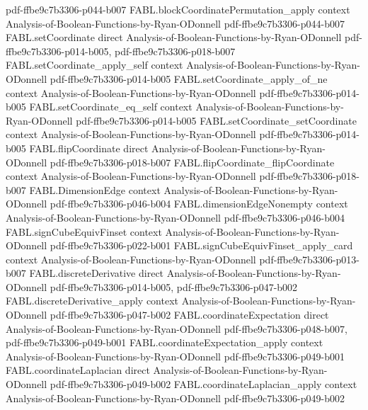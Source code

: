\begin{theorem}
  {pdf-ffbe9c7b3306-p044-b007}
\proofstep
  {FABL.blockCoordinatePermutation_apply}
  {context}
  {Analysis-of-Boolean-Functions-by-Ryan-ODonnell}
  {pdf-ffbe9c7b3306-p044-b007}
\proofstep
  {FABL.setCoordinate}
  {direct}
  {Analysis-of-Boolean-Functions-by-Ryan-ODonnell}
  {pdf-ffbe9c7b3306-p014-b005,
    pdf-ffbe9c7b3306-p018-b007}
\proofstep
  {FABL.setCoordinate_apply_self}
  {context}
  {Analysis-of-Boolean-Functions-by-Ryan-ODonnell}
  {pdf-ffbe9c7b3306-p014-b005}
\proofstep
  {FABL.setCoordinate_apply_of_ne}
  {context}
  {Analysis-of-Boolean-Functions-by-Ryan-ODonnell}
  {pdf-ffbe9c7b3306-p014-b005}
\proofstep
  {FABL.setCoordinate_eq_self}
  {context}
  {Analysis-of-Boolean-Functions-by-Ryan-ODonnell}
  {pdf-ffbe9c7b3306-p014-b005}
\proofstep
  {FABL.setCoordinate_setCoordinate}
  {context}
  {Analysis-of-Boolean-Functions-by-Ryan-ODonnell}
  {pdf-ffbe9c7b3306-p014-b005}
\proofstep
  {FABL.flipCoordinate}
  {direct}
  {Analysis-of-Boolean-Functions-by-Ryan-ODonnell}
  {pdf-ffbe9c7b3306-p018-b007}
\proofstep
  {FABL.flipCoordinate_flipCoordinate}
  {context}
  {Analysis-of-Boolean-Functions-by-Ryan-ODonnell}
  {pdf-ffbe9c7b3306-p018-b007}
\proofstep
  {FABL.DimensionEdge}
  {context}
  {Analysis-of-Boolean-Functions-by-Ryan-ODonnell}
  {pdf-ffbe9c7b3306-p046-b004}
\proofstep
  {FABL.dimensionEdgeNonempty}
  {context}
  {Analysis-of-Boolean-Functions-by-Ryan-ODonnell}
  {pdf-ffbe9c7b3306-p046-b004}
\proofstep
  {FABL.signCubeEquivFinset}
  {context}
  {Analysis-of-Boolean-Functions-by-Ryan-ODonnell}
  {pdf-ffbe9c7b3306-p022-b001}
\proofstep
  {FABL.signCubeEquivFinset_apply_card}
  {context}
  {Analysis-of-Boolean-Functions-by-Ryan-ODonnell}
  {pdf-ffbe9c7b3306-p013-b007}
\proofstep
  {FABL.discreteDerivative}
  {direct}
  {Analysis-of-Boolean-Functions-by-Ryan-ODonnell}
  {pdf-ffbe9c7b3306-p014-b005,
    pdf-ffbe9c7b3306-p047-b002}
\proofstep
  {FABL.discreteDerivative_apply}
  {context}
  {Analysis-of-Boolean-Functions-by-Ryan-ODonnell}
  {pdf-ffbe9c7b3306-p047-b002}
\proofstep
  {FABL.coordinateExpectation}
  {direct}
  {Analysis-of-Boolean-Functions-by-Ryan-ODonnell}
  {pdf-ffbe9c7b3306-p048-b007,
    pdf-ffbe9c7b3306-p049-b001}
\proofstep
  {FABL.coordinateExpectation_apply}
  {context}
  {Analysis-of-Boolean-Functions-by-Ryan-ODonnell}
  {pdf-ffbe9c7b3306-p049-b001}
\proofstep
  {FABL.coordinateLaplacian}
  {direct}
  {Analysis-of-Boolean-Functions-by-Ryan-ODonnell}
  {pdf-ffbe9c7b3306-p049-b002}
\proofstep
  {FABL.coordinateLaplacian_apply}
  {context}
  {Analysis-of-Boolean-Functions-by-Ryan-ODonnell}
  {pdf-ffbe9c7b3306-p049-b002}
\proofstep

\end{theorem}
